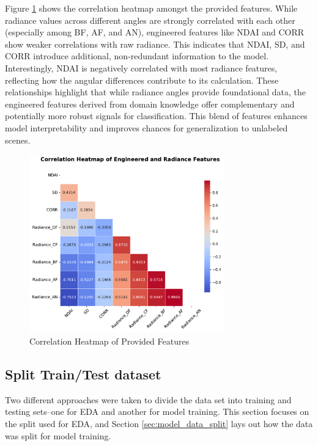 \documentclass[11pt,letterpaper]{article}
\begin{document}
Figure \ref{fig:eda3} shows the correlation heatmap amongst the provided features. While radiance values across different angles are strongly correlated with each other (especially among BF, AF, and AN), engineered features like NDAI and CORR show weaker correlations with raw radiance. This indicates that NDAI, SD, and CORR introduce additional, non-redundant information to the model. Interestingly, NDAI is negatively correlated with most radiance features, reflecting how the angular differences contribute to its calculation. These relationships highlight that while radiance angles provide foundational data, the engineered features derived from domain knowledge offer complementary and potentially more robust signals for classification. This blend of features enhances model interpretability and improves chances for generalization to unlabeled scenes.
\begin{figure}[H]
    \centering
    \includegraphics[width=0.75\textwidth]{figs/eda3.pdf}
    \caption{Correlation Heatmap of Provided Features}
    \label{fig:eda3}
\end{figure}\noindent


\vspace{1em} %
\subsection{Split Train/Test dataset}
\vspace{0.5em} %
Two different approaches were taken to divide the data set into training and testing sets--one for EDA and another for model training. This section focuses on the split used for EDA, and Section \ref{sec:model_data_split} lays out how the data was split for model training.
\end{document}
